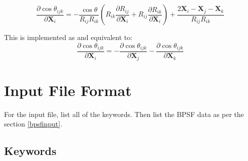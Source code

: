 \documentclass{article}
\newcommand{\mb}[1]{\mathbf{#1}}
\begin{document}
\begin{equation}
\frac{\partial \cos \theta_{ijk} } {\partial \mb{X}_i} = -\frac{\cos{\theta}  }{  R_{ij}  R_{ik} }  
\left( R_{ik} \frac{\partial R_{ij} } {\partial \mb{X}_i} + R_{ij} \frac{\partial R_{ik} } {\partial \mb{X}_i} \right) + \frac{ 2\mb{X}_i - \mb{X}_j - \mb{X}_k} { R_{ij} R_{ik} }
\end{equation}

This is implemented as and equivalent to:
\begin{equation}
\frac{\partial \cos \theta_{ijk} } {\partial \mb{X}_i} = - \frac{\partial \cos \theta_{ijk} } {\partial \mb{X}_j} - \frac{\partial \cos \theta_{ijk} } {\partial \mb{X}_k}
\end{equation}

\section{Input File Format}

For the input file, list all of the keywords. Then list the BPSF data as per the section \ref{bpsfinput}.

\subsection{Keywords}
\end{document}
